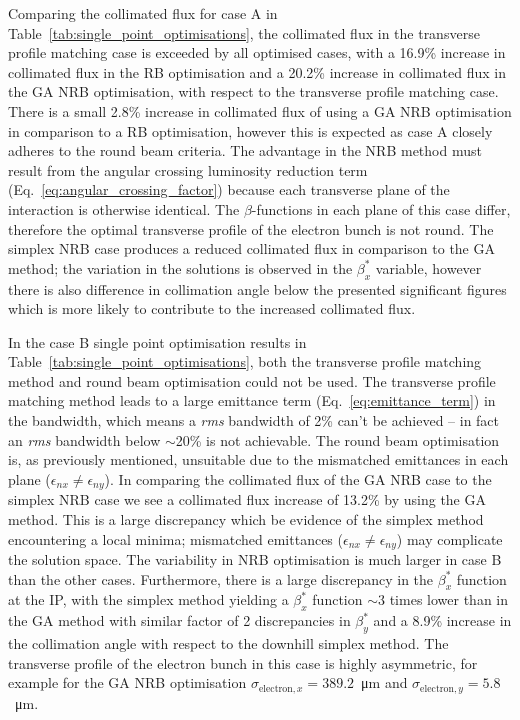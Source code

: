 \documentclass[../main.tex]{subfiles}
\begin{document}
Comparing the collimated flux for case A in Table~\ref{tab:single_point_optimisations}, the collimated flux in the transverse profile matching case is exceeded by all optimised cases, with a 16.9\% increase in collimated flux in the RB optimisation and a 20.2\% increase in collimated flux in the GA NRB optimisation, with respect to the transverse profile matching case. There is a small 2.8\% increase in collimated flux of using a GA NRB optimisation in comparison to a RB optimisation, however this is expected as case A closely adheres to the round beam criteria. The advantage in the NRB method must result from the angular crossing luminosity reduction term (Eq.~\ref{eq:angular_crossing_factor}) because each transverse plane of the interaction is otherwise identical. The $\beta$-functions in each plane of this case differ, therefore the optimal transverse profile of the electron bunch is not round. The simplex NRB case produces a reduced collimated flux in comparison to the GA method; the variation in the solutions is observed in the $\beta_{x}^{*}$ variable, however there is also difference in collimation angle below the presented significant figures which is more likely to contribute to the increased collimated flux. 

In the case B single point optimisation results in Table~\ref{tab:single_point_optimisations}, both the transverse profile matching method and round beam optimisation could not be used. The transverse profile matching method leads to a large emittance term (Eq.~\ref{eq:emittance_term}) in the bandwidth, which means a \textit{rms} bandwidth of 2\% can't be achieved -- in fact an \textit{rms} bandwidth below $\sim$20\% is not achievable. The round beam optimisation is, as previously mentioned, unsuitable due to the mismatched emittances in each plane ($\epsilon_{nx}\neq\epsilon_{ny}$). In comparing the collimated flux of the GA NRB case to the simplex NRB case we see a collimated flux increase of 13.2\% by using the GA method. This is a large discrepancy which be evidence of the simplex method encountering a local minima; mismatched emittances ($\epsilon_{nx}\neq\epsilon_{ny}$) may complicate the solution space. The variability in NRB optimisation is much larger in case B than the other cases. Furthermore, there is a large discrepancy in the $\beta_{x}^{*}$ function at the IP, with the simplex method yielding a $\beta_{x}^{*}$ function $\sim3$ times lower than in the GA method with similar factor of 2 discrepancies in $\beta_{y}^{*}$ and a 8.9\% increase in the collimation angle with respect to the downhill simplex method. The transverse profile of the electron bunch in this case is highly asymmetric, for example for the GA NRB optimisation $\sigma_{\mathrm{electron},x} = 389.2$~\si{\micro\meter} and $\sigma_{\mathrm{electron},y} = 5.8$~\si{\micro\meter}.
\end{document}

